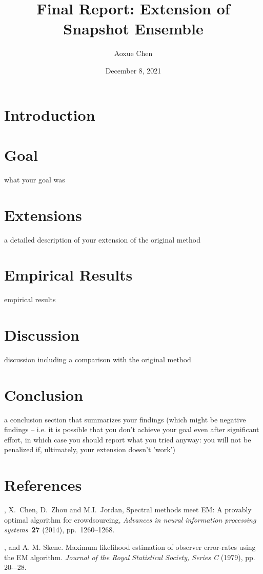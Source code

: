 \documentclass{article}
\title{Final Report: Extension of Snapshot Ensemble}
\author{Aoxue Chen}
\date{December 8, 2021}
\begin{document}
\maketitle

\section{Introduction}


\section{Goal}

what your goal was

\section{Extensions}

a detailed description of your extension of the original method

\section{Empirical Results}

empirical results

\section{Discussion}

discussion including a comparison with the original method

\section{Conclusion}

a conclusion section that summarizes your findings (which might be negative findings -- i.e. it is possible that you don't achieve your goal even after significant effort, in which case you should report what you tried anyway: you will not be penalized if, ultimately, your extension doesn't 'work')

\section*{References}
\beginrefs
{}, {\sc X.~Chen}, {\sc D.~Zhou} and {\sc M.I.~Jordan},
Spectral methods meet EM: A provably optimal algorithm for crowdsourcing, 
{\it Advances in neural information processing systems\/}~{\bf 27} (2014),
pp.~1260--1268.

\noindent \medskip
{}, and {\sc A. M. Skene}. Maximum likelihood estimation of observer error-rates using the EM algorithm. {\it Journal of the Royal Statistical Society, Series C\/} (1979), pp. 20-–28.
\endrefs
\end{document}
